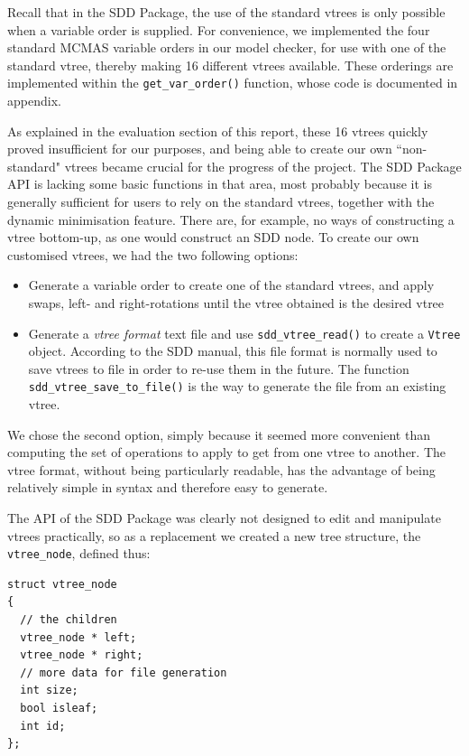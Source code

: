 \documentclass[11pt]{article}
\begin{document}
Recall that in the SDD Package, the use of the standard vtrees is only possible when a variable order is supplied. For convenience, we implemented the four standard MCMAS variable orders in our model checker, for use with one of the standard vtree, thereby making 16 different vtrees available. These orderings are implemented within the \texttt{get\_var\_order()} function, whose code is documented in appendix. 

As explained in the evaluation section of this report, these 16 vtrees quickly proved insufficient for our purposes, and being able to create our own ``non-standard" vtrees became crucial for the progress of the project.  
The SDD Package API is lacking some basic functions in that area, most probably because it is generally sufficient for users to rely on the standard vtrees, together with the dynamic minimisation feature. There are, for example, no ways of constructing a vtree bottom-up, as one would construct an SDD node. To create our own customised vtrees, we had the two following options:
\begin{itemize}
\item Generate a variable order to create one of the standard vtrees, and apply swaps, left- and right-rotations until the vtree obtained is the desired vtree
\item Generate a \textit{vtree format} text file and use \texttt{sdd\_vtree\_read()} to create a \texttt{Vtree} object. According to the SDD manual, this file format is normally used to save vtrees to file in order to re-use them in the future. The function \texttt{sdd\_vtree\_save\_to\_file()} is the way to generate the file from an existing vtree.

\end{itemize}
We chose the second option, simply because it seemed more convenient than computing the set of operations to apply to get from one vtree to another. The vtree format, without being particularly readable, has the advantage of being relatively simple in syntax and therefore easy to generate. 

The API of the SDD Package was clearly not designed to edit and manipulate vtrees practically, so as a replacement we created a new tree structure, the \texttt{vtree\_node}, defined thus: 
\begin{verbatim}
struct vtree_node 
{
  // the children
  vtree_node * left; 
  vtree_node * right;
  // more data for file generation
  int size;
  bool isleaf;
  int id;
};
\end{verbatim}
\end{document}
